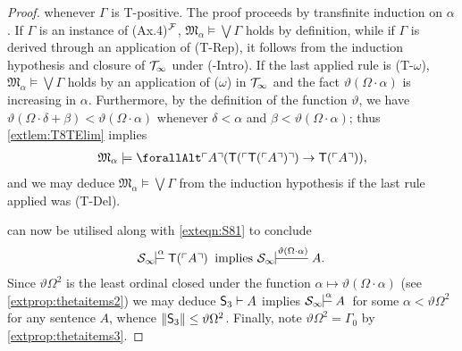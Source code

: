 \documentclass[UKenglish,cleveref,DIV=12]{scrartcl}
\let\forall\forallAlt
\theoremstyle{definition}
\theoremstyle{definition}
\begin{document}
\begin{proof}
whenever $\Gamma$ is T-positive. The
proof proceeds by transfinite induction on $\alpha$. If $\Gamma$ is an instance
of (Ax.4)$^{\mathcal{F}}$, $\mathfrak{M}_\alpha\models\bigvee\Gamma$ holds by definition,
while if $\Gamma$ is derived through an application of (T-Rep), it follows from
the induction hypothesis and closure of $\mathcal{T}_\infty$ under (-Intro). If the last applied rule is (T-$\omega$), $\mathfrak{M}_\alpha\models\bigvee\Gamma$ holds by an application of
($\omega$) in $\mathcal{T}_\infty$ and the fact $\vartheta(\Omega\cdot\alpha)$ is increasing in $\alpha$.
Furthermore, by the definition of the function $\vartheta$, we have
$\vartheta(\Omega\cdot\delta+\beta)<\vartheta(\Omega\cdot\alpha)$ whenever
$\delta<\alpha$ and $\beta<\vartheta(\Omega\cdot\alpha)$; thus
\cref{extlem:T8TElim} implies
\begin{align*}
  \mathfrak{M}_\alpha\models\forall\gn A(\T(\gn{\T(\gn A)})\rightarrow \T(\gn A)),
\end{align*}
and we may deduce $\mathfrak{M}_\alpha\models\bigvee\Gamma$ from the induction
hypothesis if the last rule applied was (T-Del).

 can now be utilised along with \cref{exteqn:S81} to conclude
\begin{align*}%
 \theoryinf S\prov\alpha{}{\T(\gn A)}\text{ implies }\theoryinf
S\prov{\vartheta(\Omega\cdot\alpha)}{} {A.}
\end{align*}
Since $\vartheta\Omega^2$ is the least ordinal closed under the function
$\alpha\mapsto\vartheta(\Omega\cdot\alpha)$ (see \cref{extprop:thetaitems2}) we
may deduce $\mathsf{S}_3\vdash A$ implies $\theoryinf S\prov\alpha{}A$ for
some $\alpha<\vartheta\Omega^2$ for any sentence $A$, whence $\lVert{\mathsf{S}_3}\rVert\le\vartheta\Omega^2$. Finally, note $\vartheta\Omega^2=\Gamma_0$
by \cref{extprop:thetaitems3}.
\end{proof}
\end{document}
